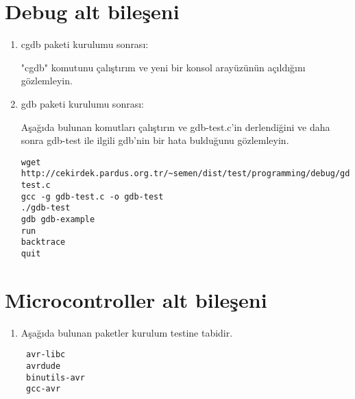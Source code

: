 \documentclass[a4paper,10pt]{article}
\begin{document}
\section{Debug alt bileşeni}
\begin{enumerate}
\item cgdb paketi kurulumu sonrası:

"cgdb" komutunu çalıştırım ve yeni bir konsol arayüzünün açıldığını gözlemleyin.
 \item gdb paketi kurulumu sonrası:

Aşağıda bulunan komutları çalıştırın ve gdb-test.c'in derlendiğini ve daha sonra gdb-test ile ilgili gdb'nin bir hata bulduğunu gözlemleyin.
\begin{verbatim}
wget http://cekirdek.pardus.org.tr/~semen/dist/test/programming/debug/gdb-test.c
gcc -g gdb-test.c -o gdb-test
./gdb-test
gdb gdb-example
run
backtrace
quit
\end{verbatim}


\end{enumerate}


\section{Microcontroller alt bileşeni}
\begin{enumerate}
 \item Aşağıda bulunan paketler kurulum testine tabidir.
\begin{verbatim}
 avr-libc
 avrdude
 binutils-avr
 gcc-avr
\end{verbatim}

\end{enumerate}
\end{document}
